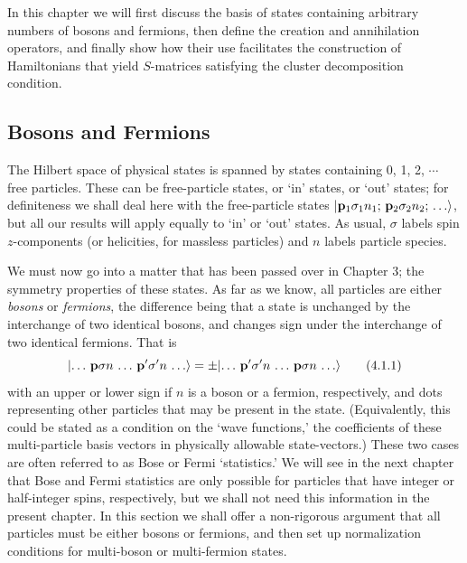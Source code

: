 In this chapter we will first discuss the basis of states containing arbitrary
numbers of bosons and fermions, then define the creation and annihilation
operators, and finally show how their use facilitates the construction of
Hamiltonians that yield $S$-matrices satisfying the cluster decomposition
condition.

\subsection{Bosons and Fermions}

The Hilbert space of physical states is spanned by states containing 0,
1, 2, $\cdots$ free particles. These can be free-particle states, or `in' states, or
`out' states; for definiteness we shall deal here with the free-particle states
$\lvert \mathbf p_1\sigma_1n_1;\,\mathbf p_2\sigma_2n_2;\,\ldots\rangle$, but all our results will apply
equally to `in' or `out' states. As usual, $\sigma$ labels spin $z$-components
(or helicities, for massless particles) and $n$ labels particle species.

We must now go into a matter that has been passed over in Chapter 3;
the symmetry properties of these states. As far as we know, all particles
are either \textit{bosons} or \textit{fermions}, the difference being that a state is unchanged
by the interchange of two identical bosons, and changes sign under the
interchange of two identical fermions. That is
\begin{equation}
  \lvert \ldots\,\mathbf p\sigma n\,\ldots\,\mathbf p'\sigma'n\,\ldots\rangle
  = \pm\lvert \ldots\,\mathbf p'\sigma'n\,\ldots\,\mathbf p\sigma n\,\ldots\rangle
  \tag{4.1.1}
  \label{eq:4.1.1}
\end{equation}
with an upper or lower sign if $n$ is a boson or a fermion, respectively,
and dots representing other particles that may be present in the state.
(Equivalently, this could be stated as a condition on the `wave functions,'
the coefficients of these multi-particle basis vectors in physically allowable
state-vectors.) These two cases are often referred to as Bose or Fermi
`statistics.' We will see in the next chapter that Bose and Fermi statistics
are only possible for particles that have integer or half-integer spins,
respectively, but we shall not need this information in the present chapter. In
this section we shall offer a non-rigorous argument that all particles must
be either bosons or fermions, and then set up normalization conditions
for multi-boson or multi-fermion states.

